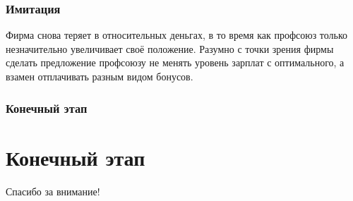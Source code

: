 \documentclass {beamer}
\begin{document}
\begin{frame}
	\frametitle{Имитация}
Фирма снова теряет в относительных деньгах, в то время как профсоюз только
незначительно увеличивает своё положение.  Разумно с точки зрения фирмы сделать
предложение профсоюзу не менять уровень зарплат с оптимального, а взамен
отплачивать разным видом бонусов.
	\end{frame}



\begin{frame}
\frametitle{Конечный этап}
\section{Конечный этап}
Спасибо за внимание!\\
\end{frame}
\end{document}
